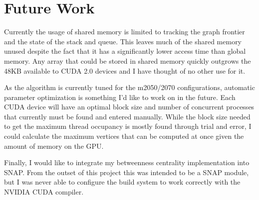 \documentclass[10pt,twocolumn]{article}
\begin{document}
\section{Future Work}
Currently the usage of shared memory is limited to tracking the graph frontier and the state of the stack and queue. This leaves much of the shared memory unused despite the fact that it has a significantly lower access time than global memory. Any array that could be stored in shared memory quickly outgrows the 48KB available to CUDA 2.0 devices and I have thought of no other use for it.

As the algorithm is currently tuned for the m2050/2070 configurations, automatic parameter optimization is something I'd like to work on in the future. Each CUDA device will have an optimal block size and number of concurrent processes that currently must be found and entered manually. While the block size needed to get the maximum thread occupancy is mostly found through trial and error, I could calculate the maximum vertices that can be computed at once given the amount of memory on the GPU.

Finally, I would like to integrate my betweenness centrality implementation into SNAP. From the outset of this project this was intended to be a SNAP module, but I was never able to configure the build system to work correctly with the NVIDIA CUDA compiler.



\end{document}
